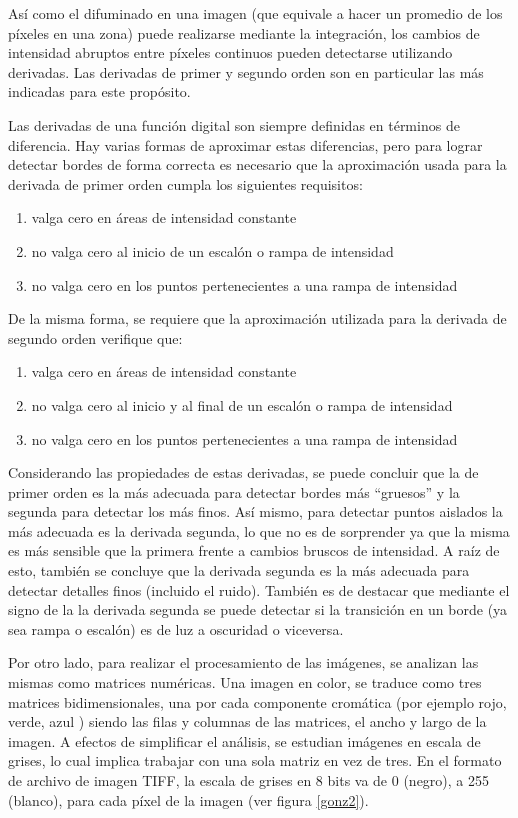 Así como el difuminado en una imagen (que equivale a hacer un promedio de los píxeles en una zona) puede realizarse mediante la integración, los cambios de intensidad abruptos entre píxeles continuos pueden detectarse utilizando derivadas. Las derivadas de primer y segundo orden son en particular las más indicadas para este propósito.

Las derivadas de una función digital son siempre definidas en términos de diferencia. Hay varias formas de aproximar estas diferencias, pero para lograr detectar bordes de forma correcta es necesario que la aproximación usada para la derivada de primer orden cumpla los siguientes requisitos:

\begin{enumerate}
\item valga cero en áreas de intensidad constante
\item no valga cero al inicio de un escalón o rampa de intensidad
\item no valga cero en los puntos pertenecientes a una rampa de intensidad
\end{enumerate}

De la misma forma, se requiere que la aproximación utilizada para la derivada de segundo orden verifique que:

\begin{enumerate}
\item valga cero en áreas de intensidad constante
\item no valga cero al inicio y al final de un escalón o rampa de intensidad
\item no valga cero en los puntos pertenecientes a una rampa de intensidad
\end{enumerate}

Considerando las propiedades de estas derivadas, se puede concluir que la de primer orden es la más adecuada para detectar bordes más ``gruesos'' y la segunda para detectar los más finos. Así mismo, para detectar puntos aislados la más adecuada es la derivada segunda, lo que no es de sorprender ya que la misma es más sensible que la primera frente a cambios bruscos de intensidad. A raíz de esto, también se concluye que la derivada segunda es la más adecuada para detectar detalles finos (incluido el ruido). También es de destacar que mediante el signo de la la derivada segunda se puede detectar si la transición en un borde (ya sea rampa o escalón) es de luz a oscuridad o viceversa.

Por otro lado, para realizar el procesamiento de las imágenes, se analizan las mismas como matrices numéricas. Una imagen en color, se traduce como tres matrices bidimensionales, una por cada componente cromática (por ejemplo rojo, verde, azul ) siendo las filas y columnas de las matrices, el ancho y largo de la imagen. 
A efectos de simplificar el análisis, se estudian imágenes en escala de grises, lo cual implica trabajar con una sola matriz en vez de tres. En el formato de archivo de imagen TIFF, la escala de grises en 8 bits va de 0 (negro), a 255 (blanco), para cada píxel de la imagen (ver figura \ref{gonz2}).

